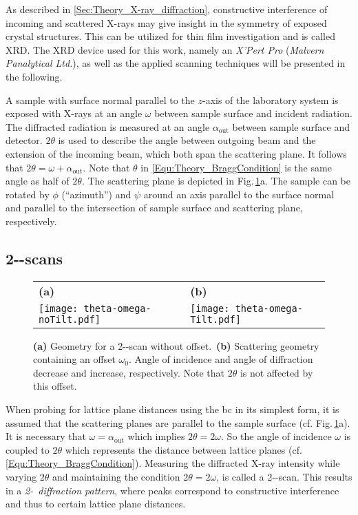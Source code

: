 \label{Sec:Methods_XRD}
As described in \ref{Sec:Theory_X-ray_diffraction}, constructive interference of incoming and scattered X-rays may give insight in the symmetry of exposed crystal structures.
This can be utilized for thin film investigation and is called \gls{XRD}.
The \gls{XRD} device used for this work, namely an \textit{X'Pert Pro} (\textit{Malvern Panalytical Ltd.}), as well as the applied scanning techniques will be presented in the following.

A sample with surface normal parallel to the $z$-axis of the laboratory system is exposed with X-rays at an angle $\omega$ between sample surface and incident radiation.
The diffracted radiation is measured at an angle $\alpha_\mathrm{out}$ between sample surface and detector.
$2\theta$ is used to describe the angle between outgoing beam and the extension of the incoming beam, which both span the scattering plane.
It follows that $2\theta=\omega+\alpha_\mathrm{out}$.
Note that $\theta$ in \eqref{Equ:Theory_BraggCondition} is the same angle as half of $2\theta$.
The scattering plane is depicted in Fig.\,\ref{Fig:Methods_XRD_geometry}a.
The sample can be rotated by $\phi$ (\enquote{azimuth}) and $\psi$ around an axis parallel to the surface normal and parallel to the intersection of sample surface and scattering plane, respectively.

\subsection{2\texttheta-\textomega-scans}
    \label{Sec:Methods_2ThetaOmega}
\begin{figure}
    \centering
    \begin{tabular}{ll}
        \textbf{(a)}&\textbf{(b)}\\
        \texttt{[image: theta-omega-noTilt.pdf]}
        &\texttt{[image: theta-omega-Tilt.pdf]}
    \end{tabular}
    \caption{\textbf{(a)} Geometry for a 2\texttheta-\textomega-scan without offset.\ \textbf{(b)} Scattering geometry containing an offset $\omega_0$. Angle of incidence and angle of diffraction decrease and increase, respectively. Note that $2\theta$ is not affected by this offset.}
    \label{Fig:Methods_XRD_geometry}
\end{figure}
When probing for lattice plane distances using the \gls{bc} in its simplest form, it is assumed that the scattering planes are parallel to the sample surface (cf. Fig.\,\ref{Fig:Methods_XRD_geometry}a).
It is necessary that $\omega=\alpha_\mathrm{out}$ which implies $2\theta=2\omega$.
So the angle of incidence $\omega$ is coupled to $2\theta$ which represents the distance between lattice planes (cf. \eqref{Equ:Theory_BraggCondition}).
Measuring the diffracted X-ray intensity while varying $2\theta$ and maintaining the condition $2\theta=2\omega$, is called a 2\texttheta-\textomega-scan.
This results in a \emph{2\texttheta-\textomega\ diffraction pattern}, where peaks correspond to constructive interference and thus to certain lattice plane distances.

